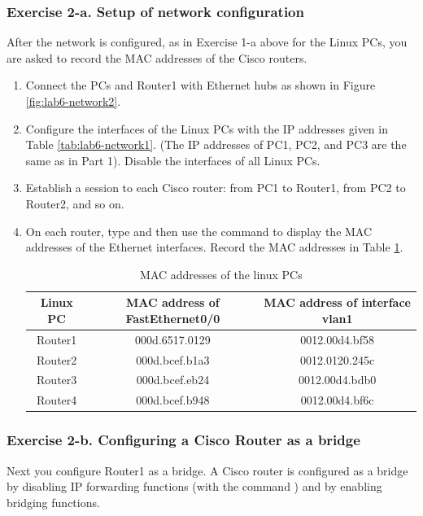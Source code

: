 \subsubsection{Exercise 2-a. Setup of network configuration}
After the network is configured, as in Exercise 1-a above for the Linux PCs, you are asked to record the MAC addresses of the Cisco routers.
\begin{enumerate}
	\item Connect the PCs and Router1 with Ethernet hubs as shown in Figure \ref{fig:lab6-network2}.
	\item Configure the  interfaces of the Linux PCs with the IP addresses given in Table \ref{tab:lab6-network1}. (The IP addresses of PC1, PC2, and PC3 are the same as in Part 1). Disable the  interfaces of all Linux PCs.
	\item Establish a  session to each Cisco router: from PC1 to Router1, from PC2 to Router2, and so on.
	\item On each router, type  and then use the command  to display the MAC addresses of the Ethernet interfaces. Record the MAC addresses in Table \ref{tab:lab6-macs-routers}.
		\begin{table}[h!t]
			\centering
			\begin{tabular}{| c | c | c |}
				\hline
				\textbf{Linux PC} & \textbf{MAC address of FastEthernet0/0} & \textbf{MAC address of interface vlan1} \\ \hline
				Router1 & 000d.6517.0129 & 0012.00d4.bf58 \\
				Router2 & 000d.bcef.b1a3 & 0012.0120.245c \\
				Router3 & 000d.bcef.eb24 & 0012.00d4.bdb0 \\
				Router4 & 000d.bcef.b948 & 0012.00d4.bf6c \\ \hline
			\end{tabular}
			\caption{MAC addresses of the linux PCs}
			\label{tab:lab6-macs-routers}
		\end{table}
\end{enumerate}

\subsubsection{Exercise 2-b. Configuring a Cisco Router as a bridge}

Next you configure Router1 as a bridge. A Cisco router is configured as a bridge by disabling IP forwarding functions (with the command ) and by enabling bridging functions.

